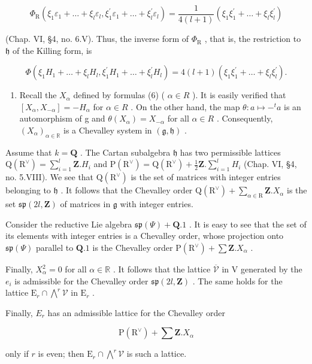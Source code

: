 \[
\varPhi_ {\mathrm{R}} (\xi_ {1} \varepsilon_ {1} + \dots + \xi_ {l} \varepsilon_ {l}, \xi_ {1} ^ {\prime} \varepsilon_ {1} + \dots + \xi_ {l} ^ {\prime} \varepsilon_ {l}) = \frac {1}{4 (l + 1)} (\xi_ {1} \xi_ {1} ^ {\prime} + \dots + \xi_ {l} \xi_ {l} ^ {\prime})
\]

(Chap. VI, §4, no. 6.V). Thus, the inverse form of \(\varPhi_{\mathrm{R}}\) , that is, the restriction to \(\mathfrak{h}\) of the Killing form, is

\[
\Phi (\xi_ {1} H _ {1} + \dots + \xi_ {l} H _ {l}, \xi_ {1} ^ {\prime} H _ {1} + \dots + \xi_ {l} ^ {\prime} H _ {l}) = 4 (l + 1) (\xi_ {1} \xi_ {1} ^ {\prime} + \dots + \xi_ {l} \xi_ {l} ^ {\prime}).
\]

\begin{enumerate}
\def\labelenumi{(\Roman{enumi})}
\setcounter{enumi}{8}
\tightlist
\item
  Recall the \(X_{\alpha}\) defined by formulas (6) ( \(\alpha \in R\) ). It is easily verified that \([X_{\alpha}, X_{-\alpha}] = -H_{\alpha}\) for \(\alpha \in R\) . On the other hand, the map \(\theta : a \mapsto -^{t}a\) is an automorphism of g and \(\theta(X_{\alpha}) = X_{-\alpha}\) for all \(\alpha \in R\) . Consequently, \((X_{\alpha})_{\alpha \in \mathbb{R}}\) is a Chevalley system in \((\mathfrak{g}, \mathfrak{h})\) .
\end{enumerate}

Assume that \(k = \mathbf{Q}\) . The Cartan subalgebra \(\mathfrak{h}\) has two permissible lattices \(\mathrm{Q}(\mathrm{R}^{\vee}) = \sum_{i=1}^{l} \mathbf{Z}.H_i\) and \(\mathrm{P}(\mathrm{R}^{\vee}) = \mathrm{Q}(\mathrm{R}^{\vee}) + \frac{1}{2}\mathbf{Z}. \sum_{i=1}^{l} H_i\) (Chap. VI, §4, no. 5.VIII). We see that \(\mathrm{Q}(\mathrm{R}^{\vee})\) is the set of matrices with integer entries belonging to \(\mathfrak{h}\) . It follows that the Chevalley order \(\mathrm{Q}(\mathrm{R}^{\vee}) + \sum_{\alpha \in \mathrm{R}} \mathbf{Z}.X_{\alpha}\) is the set \(\mathfrak{sp}(2l,\mathbf{Z})\) of matrices in \(\mathfrak{g}\) with integer entries.

Consider the reductive Lie algebra \(\mathfrak{sp}(\varPsi) + \mathbf{Q}.1\) . It is easy to see that the set of its elements with integer entries is a Chevalley order, whose projection onto \(\mathfrak{sp}(\varPsi)\) parallel to \(\mathbf{Q}.1\) is the Chevalley order \(\mathrm{P}(\mathrm{R}^{\vee}) + \sum \mathbf{Z}.X_{\alpha}\) .

Finally, \(X_{\alpha}^{2} = 0\) for all \(\alpha \in \mathbb{R}\) . It follows that the lattice \(\overline{\mathcal{V}}\) in \(\mathrm{V}\) generated by the \(e_i\) is admissible for the Chevalley order \(\mathfrak{sp}(2l,\mathbf{Z})\) . The same holds for the lattice \(\mathrm{E}_r \cap \bigwedge^r \mathcal{V}\) in \(\mathrm{E}_r\) .

Finally, \(E_{r}\) has an admissible lattice for the Chevalley order

\[
\mathrm{P} (\mathrm{R} ^ {\vee}) + \sum \mathbf {Z}. X _ {\alpha}
\]

only if \(r\) is even; then \(\mathrm{E}_r\cap \bigwedge^r\mathcal{V}\) is such a lattice.


